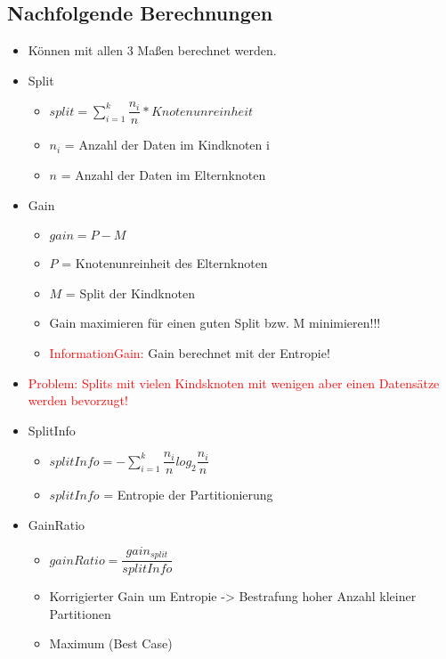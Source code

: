 \documentclass[a4paper]{article}
\begin{document}
\begin{landscape}
\begin{multicols}{3}
        \subsection{Nachfolgende Berechnungen}
        \begin{itemize}[noitemsep,nolistsep]
            \item Können mit allen 3 Maßen berechnet werden.
            \item Split
                    \begin{itemize}[noitemsep,nolistsep]
                        \item $ split = \sum_{i = 1}^{k} \dfrac{n_i}{n} * Knotenunreinheit$
                        \item $n_i$ = Anzahl der Daten im Kindknoten i
                        \item $n$ = Anzahl der Daten im Elternknoten
                    \end{itemize}
            \item Gain
                    \begin{itemize}[noitemsep,nolistsep]
                        \item $ gain = P - M$
                        \item $P$ = Knotenunreinheit des Elternknoten
                        \item $M$ = Split der Kindknoten
                        \item Gain maximieren für einen guten Split bzw. M minimieren!!!
                        \item \textcolor{red}{InformationGain: } Gain berechnet mit der Entropie!
                    \end{itemize}
            \item \textcolor{red}{Problem: Splits mit vielen Kindsknoten mit wenigen aber einen Datensätze werden bevorzugt!}
            \item SplitInfo
                    \begin{itemize}[noitemsep,nolistsep]
                        \item $ splitInfo = - \sum_{i = 1}^{k} \dfrac{n_i}{n} log_2 \dfrac{n_i}{n}$
                        \item $splitInfo$ = Entropie der Partitionierung
                    \end{itemize}
            \item GainRatio
                    \begin{itemize}[noitemsep,nolistsep]
                        \item $ gainRatio = \dfrac{gain_{split}}{splitInfo}$
                        \item Korrigierter Gain um Entropie -> Bestrafung hoher Anzahl kleiner Partitionen
                        \item Maximum (Best Case)
                    \end{itemize}
        \end{itemize}


\end{multicols}
\end{landscape}
\end{document}
